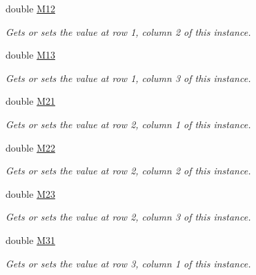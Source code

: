 \begin{DoxyCompactItemize}
double \hyperlink{struct_open_t_k_1_1_matrix3d_a63895f3ea0ee35636fc2478b09db6a09}{M12}
\begin{DoxyCompactList}\small\item\em Gets or sets the value at row 1, column 2 of this instance. \end{DoxyCompactList}\item 
double \hyperlink{struct_open_t_k_1_1_matrix3d_a182fe7255f28f26ad453ec0dd5b0c86f}{M13}
\begin{DoxyCompactList}\small\item\em Gets or sets the value at row 1, column 3 of this instance. \end{DoxyCompactList}\item 
double \hyperlink{struct_open_t_k_1_1_matrix3d_a272f2d5b7203e0eb7608aeb9f3f9f5b7}{M21}
\begin{DoxyCompactList}\small\item\em Gets or sets the value at row 2, column 1 of this instance. \end{DoxyCompactList}\item 
double \hyperlink{struct_open_t_k_1_1_matrix3d_ae481cd26be905ba8f9813e9019a12e7f}{M22}
\begin{DoxyCompactList}\small\item\em Gets or sets the value at row 2, column 2 of this instance. \end{DoxyCompactList}\item 
double \hyperlink{struct_open_t_k_1_1_matrix3d_a30ac310ded09509b0906cb45c4652ae8}{M23}
\begin{DoxyCompactList}\small\item\em Gets or sets the value at row 2, column 3 of this instance. \end{DoxyCompactList}\item 
double \hyperlink{struct_open_t_k_1_1_matrix3d_ae18e54b15e57575566986a81984233b3}{M31}
\begin{DoxyCompactList}\small\item\em Gets or sets the value at row 3, column 1 of this instance. \end{DoxyCompactList}\item 

\end{DoxyCompactItemize}
